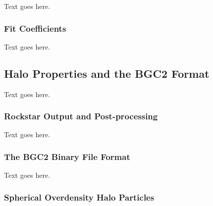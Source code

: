Text goes here.



\subsubsection{Fit Coefficients}
\label{subsubsec:analysis--fitting--fit_coefficients}


Text goes here.




\subsection{Halo Properties and the BGC2 Format}
\label{subsec:analysis--halo_properties}


Text goes here.



\subsubsection{Rockstar Output and Post-processing}
\label{subsubsec:analysis--halo_properties--output}


Text goes here.



\subsubsection{The BGC2 Binary File Format}
\label{subsubsec:analysis--halo_properties--bgc2}


Text goes here.



\subsubsection{Spherical Overdensity Halo Particles}
\label{subsubsec:analysis--halo_properties--spherical_overdensity}



